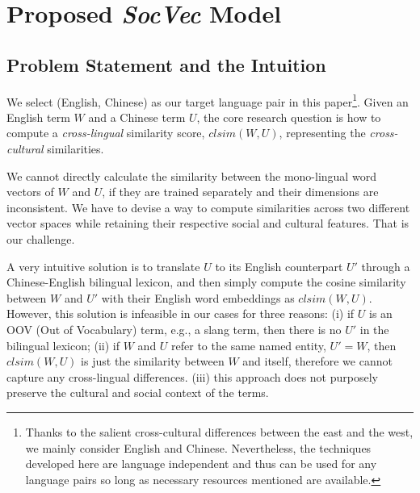 \section{Proposed \textit{SocVec} Model}
\label{sec:socvec}

\subsection{Problem Statement and the Intuition}
We select (English, Chinese) as our target language pair in this paper\footnote{Thanks to the salient cross-cultural differences between the east and the west, 
we mainly consider English and Chinese. 
Nevertheless, the techniques developed here are language independent and 
thus can be used for any language pairs so long as 
necessary resources mentioned are available.}.
Given an English term $W$ and a Chinese term $U$,
the core research question is 
how to compute a \textit{cross-lingual} similarity score, $clsim(W, U)$, representing the \textit{cross-cultural} 
similarities. 

We cannot directly calculate 
the similarity between the mono-lingual word vectors of $W$ and $U$, 
if they are trained separately and their dimensions 
are inconsistent.
We have to devise a way to compute 
similarities across two different vector spaces while retaining 
their respective social and cultural features.
That is our challenge. 

A very intuitive solution is to translate $U$ to its English 
counterpart $U'$ through a Chinese-English bilingual lexicon, and then simply compute 
the cosine similarity between $W$ and $U'$ with their English word embeddings as $clsim(W, U)$.
However, this solution is infeasible in our cases for three reasons: 
(i) if $U$ is an OOV (Out of Vocabulary) term, e.g., a slang term, 
then there is no $U'$ in the bilingual lexicon; 
(ii) if $W$ and $U$ refer to the same named entity, $U' = W$, 
then $clsim(W, U)$ is just the similarity between $W$ and itself, 
therefore we cannot capture any cross-lingual differences. 
(iii) this approach does not purposely preserve the 
cultural and social context of the terms. 

